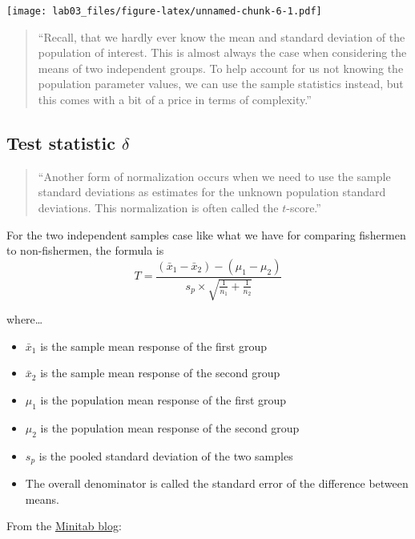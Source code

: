 \documentclass[]{article}
\providecommand{\tightlist}{%
  \setlength{\itemsep}{0pt}\setlength{\parskip}{0pt}}
\begin{document}
\texttt{[image: lab03\_files/figure-latex/unnamed-chunk-6-1.pdf]}

\begin{quote}
``Recall, that we hardly ever know the mean and standard deviation of
the population of interest. This is almost always the case when
considering the means of two independent groups. To help account for us
not knowing the population parameter values, we can use the sample
statistics instead, but this comes with a bit of a price in terms of
complexity.''
\end{quote}

\subsection{\texorpdfstring{Test statistic
\(\delta\)}{Test statistic \textbackslash{}delta}}\label{test-statistic-delta}

\begin{quote}
``Another form of normalization occurs when we need to use the sample
standard deviations as estimates for the unknown population standard
deviations. This normalization is often called the \(t\)-score.''
\end{quote}

For the two independent samples case like what we have for comparing
fishermen to non-fishermen, the formula is
\[{\displaystyle T={\frac {({\bar {x}}_{1}-{\bar {x}}_{2})- (\mu_1-\mu_2)}{s_{p}\times {\sqrt {{\frac {1}{n_{1}}}+{\frac {1}{n_{2}}}}}}}}\]

where\ldots{}

\begin{itemize}
\tightlist
\item
  \(\bar{x}_1\) is the sample mean response of the first group
\item
  \(\bar{x}_2\) is the sample mean response of the second group
\item
  \(\mu_1\) is the population mean response of the first group
\item
  \(\mu_2\) is the population mean response of the second group
\item
  \(s_p\) is the pooled standard deviation of the two samples
\item
  The overall denominator is called the standard error of the difference
  between means.
\end{itemize}

From the
\href{http://blog.minitab.com/blog/adventures-in-statistics-2/understanding-t-tests-t-values-and-t-distributions}{Minitab
blog}:
\end{document}
